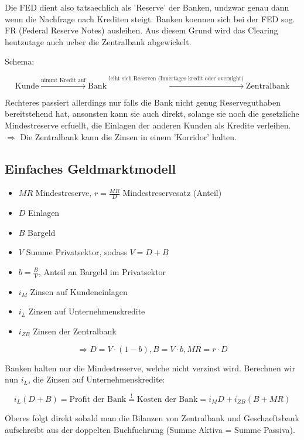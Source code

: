 \documentclass[a4paper]{article}
\begin{document}
Die FED dient also tatsaechlich als 'Reserve' der Banken, undzwar genau dann
wenn die Nachfrage nach Krediten steigt. Banken koennen sich bei der FED sog.
FR (Federal Reserve Notes) ausleihen. Aus diesem Grund wird das Clearing
heutzutage auch ueber die Zentralbank abgewickelt.

Schema:

\[
	\text{Kunde}
	\overset{\text{nimmt Kredit auf}} \longrightarrow
	\text{Bank}
	\overset{\text{leiht sich Reserven (Innertages kredit oder overnight)}}
	\longrightarrow
	\text{Zentralbank}
\]

Rechteres passiert allerdings nur falls die Bank nicht genug Reserveguthaben
bereitstehend hat, ansonsten kann sie auch direkt,
solange sie noch die gesetzliche Mindestreserve erfuellt,
die Einlagen der anderen Kunden als Kredite verleihen. \\

$\Rightarrow$ Die Zentralbank kann die Zinsen in einem 'Korridor' halten.

\subsection{Einfaches Geldmarktmodell}

\begin{itemize}
	\item $MR$ Mindestreserve, $r = \frac{ MR }{ D }$ Mindestreservesatz (Anteil)
	\item $D$ Einlagen
	\item $B$ Bargeld
	\item $V$ Summe Privatsektor, sodass $V = D + B$
	\item $b = \frac{ B }{ V }$, Anteil an Bargeld im Privatsektor
	\item $i_M$ Zinsen auf Kundeneinlagen
	\item $i_L$ Zinsen auf Unternehmenskredite
	\item $i_{ZB}$ Zinsen der Zentralbank
\end{itemize}

\[
	\Rightarrow
	D = V \cdot (1 - b),
	B = V \cdot b,
	MR = r \cdot D
\]

Banken halten nur die Mindestreserve, welche nicht verzinst wird.
Berechnen wir nun $i_L$, die Zinsen auf Unternehmenskredite:

\[
	i_L (D + B) = \text{Profit der Bank}
	\overset{!} =
	\text{Kosten der Bank}
	=
	i_M D + i_{ZB} (B + MR)
\]

Oberes folgt direkt sobald man die Bilanzen von Zentralbank und Geschaeftsbank
aufschreibt aus der doppelten Buchfuehrung (Summe Aktiva = Summe Passiva).
\end{document}
